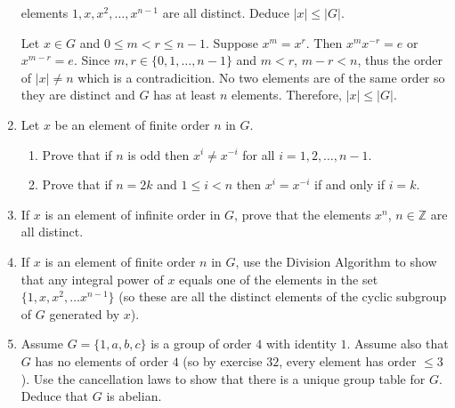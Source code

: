 \begin{enumerate}
  elements \(1,x,x^2,\ldots,x^{n - 1}\) are all distinct.
  Deduce \(\lvert x\rvert\leq\lvert G\rvert\).
  \par\smallskip
  Let \(x\in G\) and \(0\leq m < r \leq n - 1\).
  Suppose \(x^m = x^r\).
  Then \(x^mx^{-r} = e\) or \(x^{m - r} = e\).
  Since \(m,r\in\{0,1,\ldots,n - 1\}\) and \(m < r\), \(m - r < n\), thus
  the order of \(\lvert x\rvert\neq n\) which is a contradicition.
  No two elements are of the same order so they are distinct and \(G\) has at
  least \(n\) elements.
  Therefore, \(\lvert x\rvert\leq\lvert G\rvert\).
\item
  Let \(x\) be an element of finite order \(n\) in \(G\).
  \begin{enumerate}[label = (\alph*)]
  \item
    Prove that if \(n\) is odd then \(x^i\neq x^{-i}\) for all
    \(i = 1,2,\ldots, n - 1\).
  \item
    Prove that if \(n = 2k\) and \(1\leq i < n\) then \(x^i = x^{-i}\) if and
    only if \(i = k\).
  \end{enumerate}
\item
  If \(x\) is an element of infinite order in \(G\), prove that the elements
  \(x^n\), \(n\in\mathbb{Z}\) are all distinct.
  \par\smallskip
\item
  If \(x\) is an element of finite order \(n\) in \(G\), use the Division
  Algorithm to show that any integral power of \(x\) equals one of the elements
  in the set \(\{1,x,x^2,\ldots x^{n - 1}\}\) (so these are all the distinct
  elements of the cyclic subgroup of \(G\) generated by \(x\)).
\item
  Assume \(G = \{1, a, b, c\}\) is a group of order \(4\) with identity \(1\).
  Assume also that \(G\) has no elements of order \(4\) (so by exercise \(32\),
  every element has order \(\leq 3\)).
  Use the cancellation laws to show that there is a unique group table for
  \(G\).
  Deduce that \(G\) is abelian.
\end{enumerate}
